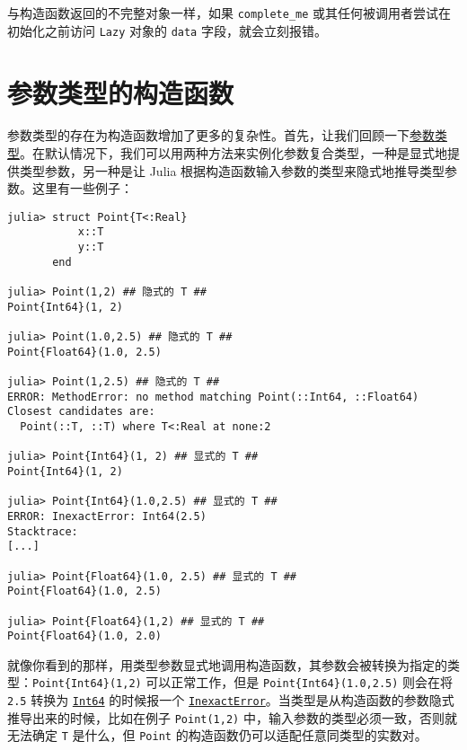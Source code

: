 与构造函数返回的不完整对象一样，如果 \texttt{complete\_me} 或其任何被调用者尝试在初始化之前访问 \texttt{Lazy} 对象的 \texttt{data} 字段，就会立刻报错。



\hypertarget{12775137678629941390}{}


\section{参数类型的构造函数}



参数类型的存在为构造函数增加了更多的复杂性。首先，让我们回顾一下\href{@ref}{参数类型}。在默认情况下，我们可以用两种方法来实例化参数复合类型，一种是显式地提供类型参数，另一种是让 Julia 根据构造函数输入参数的类型来隐式地推导类型参数。这里有一些例子：




\begin{verbatim}
julia> struct Point{T<:Real}
           x::T
           y::T
       end

julia> Point(1,2) ## 隐式的 T ##
Point{Int64}(1, 2)

julia> Point(1.0,2.5) ## 隐式的 T ##
Point{Float64}(1.0, 2.5)

julia> Point(1,2.5) ## 隐式的 T ##
ERROR: MethodError: no method matching Point(::Int64, ::Float64)
Closest candidates are:
  Point(::T, ::T) where T<:Real at none:2

julia> Point{Int64}(1, 2) ## 显式的 T ##
Point{Int64}(1, 2)

julia> Point{Int64}(1.0,2.5) ## 显式的 T ##
ERROR: InexactError: Int64(2.5)
Stacktrace:
[...]

julia> Point{Float64}(1.0, 2.5) ## 显式的 T ##
Point{Float64}(1.0, 2.5)

julia> Point{Float64}(1,2) ## 显式的 T ##
Point{Float64}(1.0, 2.0)
\end{verbatim}



就像你看到的那样，用类型参数显式地调用构造函数，其参数会被转换为指定的类型：\texttt{Point\{Int64\}(1,2)} 可以正常工作，但是 \texttt{Point\{Int64\}(1.0,2.5)} 则会在将 \texttt{2.5} 转换为 \hyperlink{7720564657383125058}{\texttt{Int64}} 的时候报一个 \hyperlink{5399118524830636312}{\texttt{InexactError}}。当类型是从构造函数的参数隐式推导出来的时候，比如在例子 \texttt{Point(1,2)} 中，输入参数的类型必须一致，否则就无法确定 \texttt{T} 是什么，但 \texttt{Point} 的构造函数仍可以适配任意同类型的实数对。



